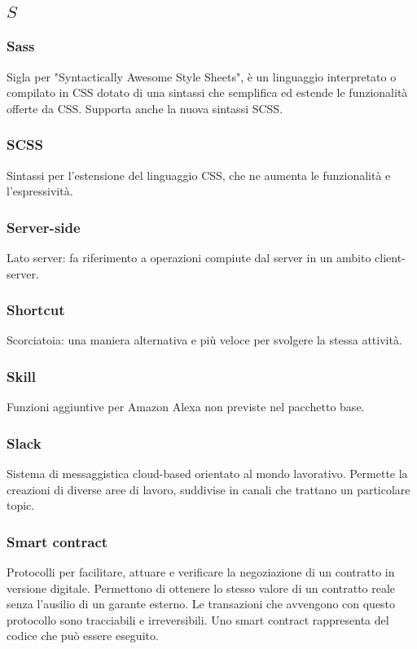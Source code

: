 \subsection*{\quad$S\quad$}
\subsubsection*{Sass}
Sigla per "Syntactically Awesome Style Sheets", è un linguaggio interpretato o compilato in CSS dotato di una sintassi che semplifica ed estende le funzionalità offerte da CSS. Supporta anche la nuova sintassi SCSS\glo.

\subsubsection*{SCSS}
Sintassi per l'estensione del linguaggio CSS, che ne aumenta le funzionalità e l'espressività.

\subsubsection*{Server-side}
Lato server: fa riferimento a operazioni compiute dal server in un ambito client-server. 

\subsubsection*{Shortcut}
Scorciatoia: una maniera alternativa e più veloce per svolgere la stessa attività.

\subsubsection*{Skill}
Funzioni aggiuntive per Amazon Alexa non previste nel pacchetto base.

\subsubsection*{Slack}
Sistema di messaggistica cloud-based orientato al mondo lavorativo. Permette la creazioni di diverse aree di lavoro, suddivise in canali che trattano un particolare topic.

\subsubsection*{Smart contract}
Protocolli per facilitare, attuare e verificare la negoziazione di un contratto in versione digitale. Permettono di ottenere lo stesso valore di un contratto reale senza l'ausilio di un garante esterno. Le transazioni che avvengono con questo protocollo sono tracciabili e irreversibili. Uno smart contract rappresenta del codice che può essere eseguito.

